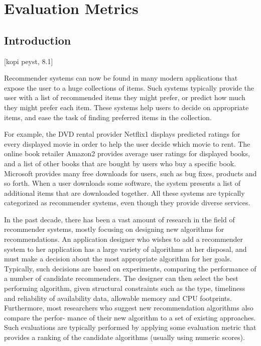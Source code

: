 
\chapter{Evaluation Metrics}\label{chapter:evaluation_metrics}

\section{Introduction}
[kopi peyst, 8.1]

Recommender systems can now be found in many modern applications that expose the user to a huge collections of items. Such systems typically provide the user with a list of recommended items they might prefer, or predict how much they might prefer each item. These systems help users to decide on appropriate items, and ease the task of finding preferred items in the collection.

For example, the DVD rental provider Netflix1 displays predicted ratings for every displayed movie in order to help the user decide which movie to rent. The online book retailer Amazon2 provides average user ratings for displayed books, and a list of other books that are bought by users who buy a specific book. Microsoft provides many free downloads for users, such as bug fixes, products and so forth. When a user downloads some software, the system presents a list of additional items that are downloaded together. All these systems are typically categorized as recommender systems, even though they provide diverse services.

In the past decade, there has been a vast amount of research in the field of recommender systems, mostly focusing on designing new algorithms for recommendations. An application designer who wishes to add a recommender system to her application has a large variety of algorithms at her disposal, and must make a decision about the most appropriate algorithm for her goals. Typically, such decisions are based on experiments, comparing the performance of a number of candidate recommenders. The designer can then select the best performing algorithm, given structural constraints such as the type, timeliness and reliability of availability data, allowable memory and CPU footprints. Furthermore, most researchers who suggest new recommendation algorithms also compare the perfor- mance of their new algorithm to a set of existing approaches. Such evaluations are typically performed by applying some evaluation metric that provides a ranking of the candidate algorithms (usually using numeric scores).

